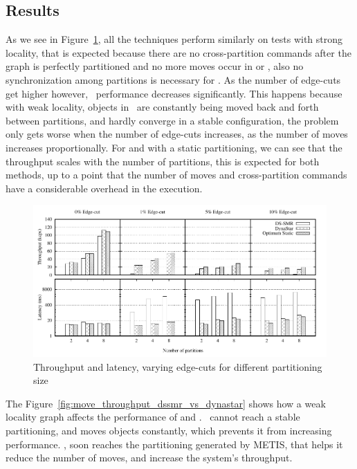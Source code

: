 \subsection{Results}
\label{sec:evaluation:results}
As we see in Figure~\ref{fig:varying_edge_cut}, all the techniques perform similarly on tests with strong locality, that is
expected because there are no cross-partition commands after the graph is perfectly partitioned and no more moves 
occur in \dynastar or \dssmr, also no synchronization among partitions is necessary for \ssmr.
As the number of edge-cuts get higher however, \dssmr\ performance decreases significantly.
This happens because with weak locality, objects in \dssmr\ are constantly being moved back and forth between partitions,
and hardly converge in a stable configuration, the problem only gets worse when the number of edge-cuts increases, as
the number of moves increases proportionally.
For \dynastar and \ssmr with a static partitioning, we can see that the throughput scales 
with the number of partitions, this is expected for both methods, up to a point that the number of moves and cross-partition
commands have a considerable overhead in the execution.

\begin{figure}[h]
	\includegraphics{figures/experiments/throughput-latency-avg-all}
	\caption{Throughput and latency, varying edge-cuts for different partitioning size}
	\label{fig:varying_edge_cut}
\end{figure}

The Figure~\ref{fig:move_throughput_dssmr_vs_dynastar} shows how a weak locality graph affects the 
performance of \dssmr and \dynastar. \dssmr\ cannot reach a stable partitioning, and moves objects constantly, which
prevents it from increasing performance. \dynastar, soon reaches the partitioning generated by METIS, that helps it
reduce the number of moves, and increase the system's throughput.

